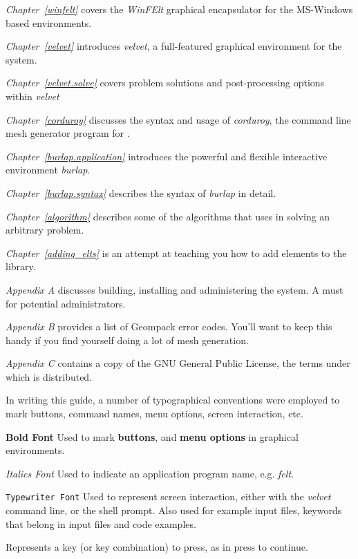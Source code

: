 {\em Chapter~\ref{winfelt}} covers the {\em WinFElt} graphical encapsulator for the 
MS-Windows based environments.

{\em Chapter~\ref{velvet}} introduces {\em velvet}, a full-featured graphical 
environment for the \felt{} system.

{\em Chapter~\ref{velvet.solve}} covers problem solutions and post-processing options within
{\em velvet}

{\em Chapter~\ref{corduroy}} discusses the syntax and usage of {\em corduroy}, the 
command line mesh generator program for \felt{}.

{\em Chapter~\ref{burlap.application}} introduces the powerful and flexible interactive environment 
{\em burlap}.

{\em Chapter~\ref{burlap.syntax}} describes the syntax of {\em burlap} in detail.

{\em Chapter~\ref{algorithm}} describes some of the algorithms that \felt{} uses in solving
an arbitrary problem.

{\em Chapter~\ref{adding_elts}} is an attempt at teaching you how to add elements
to the \felt{} library.

{\em Appendix A} discusses building, installing and administering the \felt{}
system.  A must for potential administrators.

{\em Appendix B} provides a list of Geompack error codes.  You'll want to keep 
this handy if you find yourself doing a lot of mesh generation.

{\em Appendix C} contains a copy of the GNU General Public License, the terms
under which \felt{} is distributed.

\label{foreword.convention}

In writing this guide, a number of typographical conventions were employed
to mark buttons, command names, menu options, screen interaction, etc.

\begin{dispitems}
\item [\bf Bold Font]
	Used to mark {\bf buttons}, and {\bf menu options} in graphical
	environments.

\item [\em Italics Font]
	Used to indicate an application program name, e.g. {\em felt}.

\item [\tt Typewriter Font]
	Used to represent screen interaction, either with the {\em velvet} 
        command line, or the shell prompt.
	Also used for example input files, keywords that belong in input
	files and code examples.

\item [\key{Key}]
	Represents a key (or key combination) to press, as in press
         to continue.

\end{dispitems}

